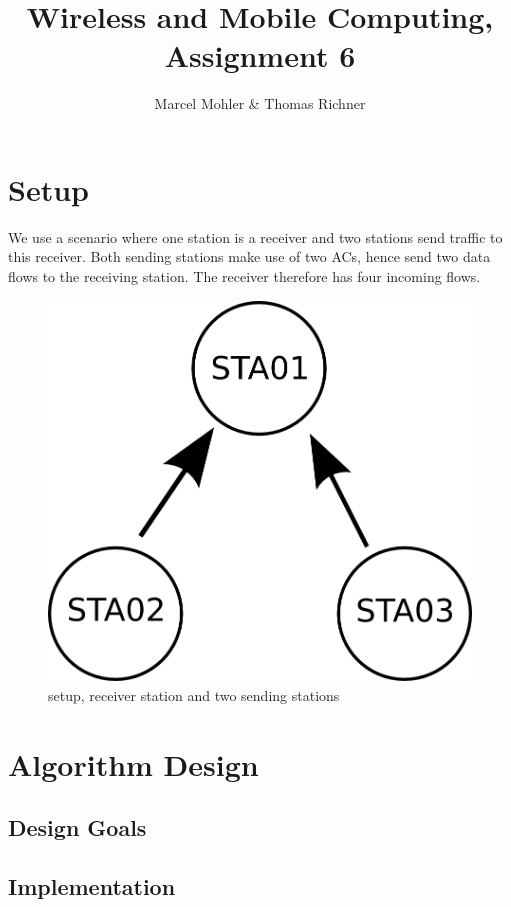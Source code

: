 \documentclass[12pt]{article}
\title{\textbf{Wireless and Mobile Computing, Assignment 6}}
\author{Marcel Mohler & Thomas Richner}
\begin{document}
\maketitle

\section{Setup}

We use a scenario where one station is a receiver and two stations send traffic to this receiver. Both sending stations make use of two ACs, hence send two data flows to the receiving station. The receiver therefore has four incoming flows.

\begin{figure}[h!]
\centering
\includegraphics[width=160mm]{img/setup.png}
\caption{setup, receiver station and two sending stations \label{fig:setup}}
\end{figure}


\section{Algorithm Design}

\subsection{Design Goals}

\subsection{Implementation}
\end{document}
